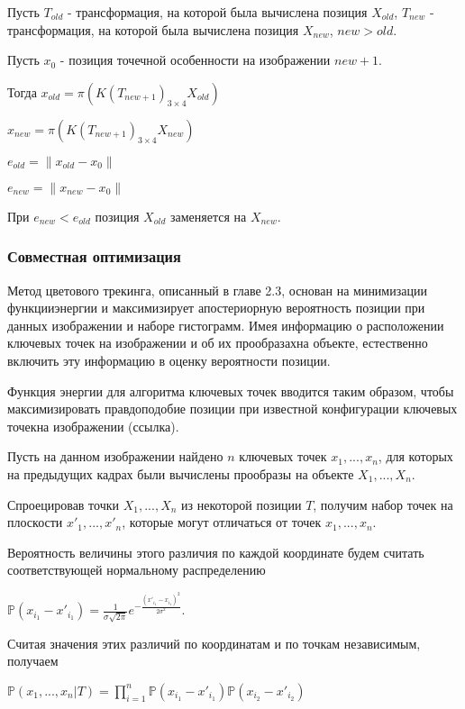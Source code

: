 Пусть $T_{old}$ - трансформация, на которой была вычислена позиция $X_{old}$,
$T_{new}$ - трансформация, на которой была вычислена позиция
$X_{new}$, $new > old$.

Пусть $x_0$ - позиция точечной особенности на изображении $new + 1$. 

Тогда $x_{old} = \pi (K (T_{new + 1})_{3 \times 4} X_{old})$

$x_{new} = \pi (K (T_{new + 1})_{3 \times 4} X_{new})$

$e_{old} = \| x_{old} - x_0 \|$

$e_{new} = \| x_{new} - x_0 \|$

При $e_{new} < e_{old}$ позиция $X_{old}$ заменяется на $X_{new}$.

\subsubsection{Совместная оптимизация}

Метод цветового трекинга, описанный в главе 2.3, основан на минимизации
функцииэнергии и максимизирует апостериорную вероятность позиции при данных
изображении и наборе гистограмм.
Имея информацию о расположении ключевых точек на изображении и об их
прообразахна объекте, естественно включить эту информацию в оценку вероятности
позиции.

Функция энергии для алгоритма ключевых точек вводится таким образом, чтобы
максимизировать правдоподобие позиции при известной конфигурации ключевых
точекна изображении (ссылка).

Пусть на данном изображении найдено $n$ ключевых точек $x_1, ..., x_n$, для
которых на предыдущих кадрах были вычислены прообразы на объекте
$X_1, ..., X_n$. 

Спроецировав точки $X_1, ..., X_n$ из некоторой позиции $T$, получим набор
точек на плоскости $x'_1, ..., x'_n$, которые могут отличаться от точек
$x_1, ..., x_n$.

Вероятность величины этого различия по каждой координате будем считать
соответствующей нормальному распределению

$
\mathbb{P}(x_{i_1} - x'_{i_1}) = \frac{1}{\sigma \sqrt{2 \pi}}e^{-
\frac{(x'_{i_1} - x_{i_1})^2}{2 \sigma^2}}
$.

Считая значения этих различий по координатам и по точкам независимым, получаем

$
\mathbb{P}(x_1, ..., x_n | T) = \prod\limits_{i = 1}^n \mathbb{P}(x_{i_1} -
x'_{i_1})\mathbb{P}(x_{i_2} - x'_{i_2})
$

